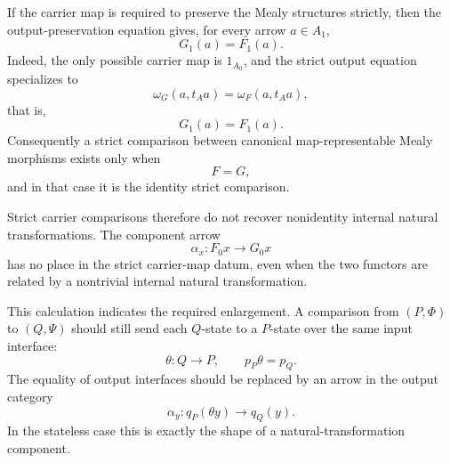 If the carrier map is required to preserve the Mealy structures strictly, then
the output-preservation equation gives, for every arrow \(a\in A_1\),
\[
    G_1(a)
    =
    F_1(a).
\]
Indeed, the only possible carrier map is \(1_{A_0}\), and the strict output
equation specializes to
\[
    \omega_G(a,t_Aa)
    =
    \omega_F(a,t_Aa),
\]
that is,
\[
    G_1(a)=F_1(a).
\]
Consequently a strict comparison between canonical map-representable Mealy
morphisms exists only when
\[
    F=G,
\]
and in that case it is the identity strict comparison.

Strict carrier comparisons therefore do not recover nonidentity internal
natural transformations. The component arrow
\[
    \alpha_x:F_0x\to G_0x
\]
has no place in the strict carrier-map datum, even when the two functors are
related by a nontrivial internal natural transformation.

This calculation indicates the required enlargement. A comparison from \((P,\Phi)\) to \((Q,\Psi)\) should still send each \(Q\)-state to a \(P\)-state over the same input interface:
\[
    \theta:Q\to P,
    \qquad
    p_P\theta=p_Q.
\]
The equality of output interfaces should be replaced by an arrow in the output category
\[
    \alpha_y:q_P(\theta y)\to q_Q(y).
\]
In the stateless case this is exactly the shape of a natural-transformation component.

